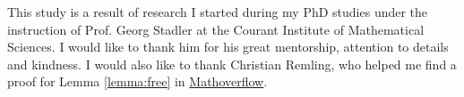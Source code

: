This study is a result of research I started during my PhD studies
under the instruction of Prof. Georg Stadler at the Courant Institute
of Mathematical Sciences. I would like to thank him for his great
mentorship, attention to details and kindness. I would also like to
thank Christian Remling, who helped me find a proof for Lemma
\ref{lemma:free} in
\href{https://mathoverflow.net/questions/280168/redistribute-diagonal-entries-of-a-matrix/280203#280203c}{Mathoverflow}.
